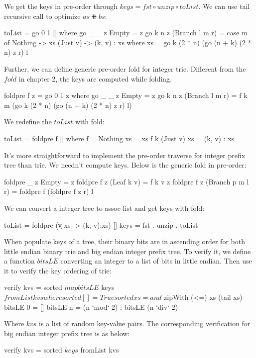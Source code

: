 \documentclass[b5paper]{article}
\begin{document}
\begin{Answer}[ref = {ex:int-tree-lookup}]
{We get the keys in pre-order through $keys = fst \circ unzip \circ toList$. We can use tail recursive call to optimize $as \doubleplus bs$:

\begin{Haskell}
toList = go 0 1 [] where
  go _ _ z Empty = z
  go k n z (Branch l m r) = case m of
    Nothing -> xs
    (Just v) -> (k, v) : xs
    where xs = go k (2 * n) (go (n + k) (2 * n) z r) l
\end{Haskell}

Further, we can define generic pre-order fold for integer trie. Different from the $fold$ in chapter 2, the keys are computed while folding.

\begin{Haskell}
foldpre f z = go 0 1 z where
  go _ _ z Empty = z
  go k n z (Branch l m r) = f k m (go k (2 * n) (go (n + k) (2 * n) z r) l)
\end{Haskell}

We redefine the $toList$ with fold:

\begin{Haskell}
toList = foldpre f [] where
  f _ Nothing xs = xs
  f k (Just v) xs = (k, v) : xs
\end{Haskell}

It's more straightforward to implement the pre-order traverse for integer prefix tree than trie. We needn't compute keys. Below is the generic fold in pre-order:

\begin{Haskell}
foldpre _ z Empty = z
foldpre f z (Leaf k v) = f k v z
foldpre f z (Branch p m l r) = foldpre f (foldpre f z r) l
\end{Haskell}

We can convert a integer tree to assoc-list and get keys with fold:
\begin{Haskell}
toList = foldpre (\k v xs -> (k, v):xs) []
keys = fst . unzip . toList
\end{Haskell}

When populate keys of a tree, their binary bits are in ascending order for both little endian binary trie and big endian integer prefix tree. To verify it, we define a function $bitsLE$ converting an integer to a list of bits in little endian. Then use it to verify the key ordering of trie:

\begin{Haskell}
verify kvs = sorted $ map bitsLE $ keys $ fromList kvs where
  sorted [] = True
  sorted xs = and $ zipWith (<=) xs (tail xs)
  bitsLE 0 = []
  bitsLE n = (n `mod` 2) : bitsLE (n `div` 2)
\end{Haskell}

Where $kvs$ is a list of random key-value pairs. The corresponding verification for big endian integer prefix tree is as below:

\begin{Haskell}
verify kvs = sorted $ keys $ fromList kvs
\end{Haskell}
}
\end{Answer}
\end{document}
